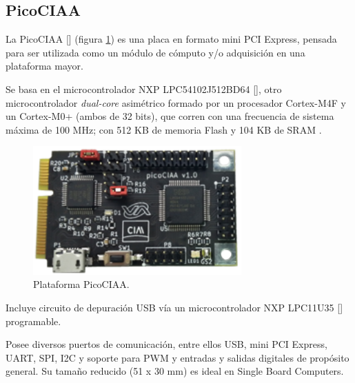 

\subsection{PicoCIAA}

La PicoCIAA [] (figura \ref{fig:picoCiaa}) es una placa en formato mini PCI Express, pensada para ser utilizada como un módulo de cómputo y/o adquisición en una plataforma mayor.

Se basa en el microcontrolador NXP LPC54102J512BD64 [], otro microcontrolador \emph{dual-core} asimétrico formado por un procesador Cortex-M4F y un Cortex-M0+ (ambos de 32 bits), que corren con una frecuencia de sistema máxima de 100 MHz; con 512 KB de memoria Flash y 104 KB de SRAM .

\begin{figure}[!htbp]
\begin{center}  %
\includegraphics*[width=8cm]{Figures/PicoCIAA_Foto.png}
\par\caption{Plataforma PicoCIAA.}\label{fig:picoCiaa}
\end{center}
\end{figure}

Incluye circuito de depuración USB vía un microcontrolador NXP LPC11U35 [] programable.

Posee diversos puertos de comunicación, entre ellos USB, mini PCI Express, UART, SPI, I2C y soporte para PWM y entradas y salidas digitales de propósito general. Su tamaño reducido (51 x 30 mm) es ideal en Single Board Computers.

